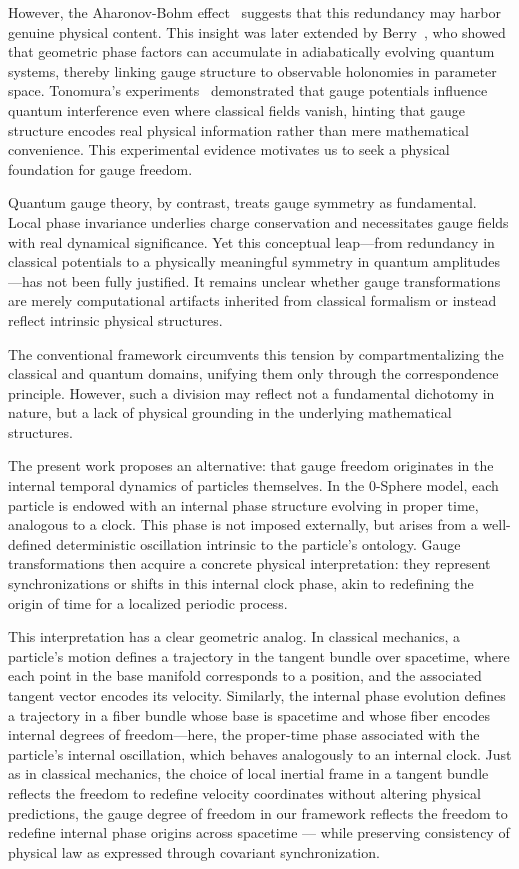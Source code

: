 \documentclass[%
 reprint,
 amsmath,amssymb,
 aps,
]{revtex4-1}
\numberwithin{equation}{section}%
\begin{document}
However, the Aharonov-Bohm effect~\cite{aharonov1959} suggests that this redundancy may harbor genuine physical content. This insight was later extended by Berry~\cite{berry1984}, who showed that geometric phase factors can accumulate in adiabatically evolving quantum systems, thereby linking gauge structure to observable holonomies in parameter space. Tonomura's experiments~\cite{tonomura1986} demonstrated that gauge potentials influence quantum interference even where classical fields vanish, hinting that gauge structure encodes real physical information rather than mere mathematical convenience. This experimental evidence motivates us to seek a physical foundation for gauge freedom.

Quantum gauge theory, by contrast, treats gauge symmetry as fundamental. Local phase invariance underlies charge conservation and necessitates gauge fields with real dynamical significance. Yet this conceptual leap—from redundancy in classical potentials to a physically meaningful symmetry in quantum amplitudes---has not been fully justified. It remains unclear whether gauge transformations are merely computational artifacts inherited from classical formalism or instead reflect intrinsic physical structures.

The conventional framework circumvents this tension by compartmentalizing the classical and quantum domains, unifying them only through the correspondence principle. However, such a division may reflect not a fundamental dichotomy in nature, but a lack of physical grounding in the underlying mathematical structures.

The present work proposes an alternative: that gauge freedom originates in the internal temporal dynamics of particles themselves. In the 0-Sphere model, each particle is endowed with an internal phase structure evolving in proper time, analogous to a clock. This phase is not imposed externally, but arises from a well-defined deterministic oscillation intrinsic to the particle’s ontology. Gauge transformations then acquire a concrete physical interpretation: they represent synchronizations or shifts in this internal clock phase, akin to redefining the origin of time for a localized periodic process.

This interpretation has a clear geometric analog. In classical mechanics, a particle’s motion defines a trajectory in the tangent bundle over spacetime, where each point in the base manifold corresponds to a position, and the associated tangent vector encodes its velocity. Similarly, the internal phase evolution defines a trajectory in a fiber bundle whose base is spacetime and whose fiber encodes internal degrees of freedom—here, the proper-time phase associated with the particle’s internal oscillation, which behaves analogously to an internal clock. Just as in classical mechanics, the choice of local inertial frame in a tangent bundle reflects the freedom to redefine velocity coordinates without altering physical predictions, the gauge degree of freedom in our framework reflects the freedom to redefine internal phase origins across spacetime --- while preserving consistency of physical law as expressed through covariant synchronization.
\end{document}
